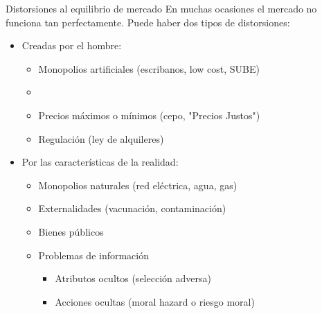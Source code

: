 \documentclass{beamer}
\begin{document}
\begin{frame}{Distorsiones al equilibrio de mercado}
    En muchas ocasiones el mercado no funciona tan perfectamente. Puede haber dos tipos de distorsiones:
    \begin{itemize}
        \item Creadas por el hombre:
        \begin{itemize}
            \item Monopolios artificiales (escribanos, low cost, SUBE)
            \vspace{1mm}
            \item {} 
            \vspace{1mm}
            \item Precios máximos o mínimos (cepo, "Precios Justos")
            \vspace{1mm}
            \item Regulación (ley de alquileres)
        \end{itemize}
        \vspace{1mm}
        \item Por las características de la realidad:
        \begin{itemize}
            \item Monopolios naturales (red eléctrica, agua, gas)   
            \vspace{1mm}
            \item Externalidades (vacunación, contaminación)
            \vspace{1mm}
            \item Bienes públicos
            \vspace{1mm}
            \item Problemas de información
            \begin{itemize}
                \item Atributos ocultos (selección adversa)
                \vspace{1mm}
                \item Acciones ocultas (moral hazard o riesgo moral)
            \end{itemize}        
        \end{itemize}
    \end{itemize}
\end{frame}
\end{document}
